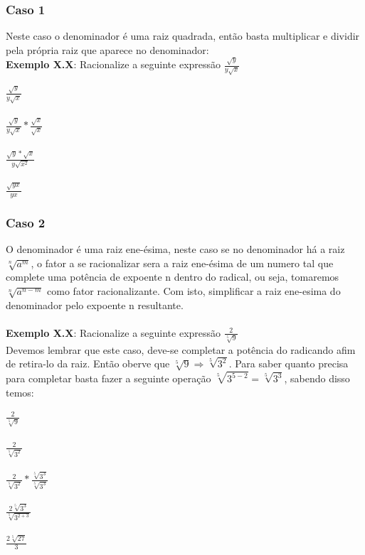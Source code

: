 \documentclass[a4paper,12pt,twoside,BCOR=10mm]{scrbook}
\begin{document}
\begin{titlepage}
\subsubsection{Caso 1}
Neste caso o denominador é uma raiz quadrada, então basta multiplicar e dividir pela própria raiz que aparece no denominador:
\\
\textbf{Exemplo X.X}: Racionalize a seguinte expressão $\frac{\sqrt{y}}{y\sqrt{x}}$
\\
\begin{center}
$\frac{\sqrt{y}}{y\sqrt{x}}$\\ \\
$\frac{\sqrt{y}}{y\sqrt{x}}*\frac{\sqrt{x}}{\sqrt{x}}$\\ \\
$\frac{\sqrt{y}*\sqrt{x}}{y\sqrt{x^{2}}}$\\ \\
$\frac{\sqrt{yx}}{yx}$
\end{center}

\subsubsection{Caso 2}
O denominador é uma raiz ene-ésima, neste caso se no denominador há a raiz $\sqrt[n]{a^{m}}$, o fator a se racionalizar sera a raiz ene-ésima de um numero tal que complete uma potência de expoente n dentro do radical, ou seja, tomaremos $\sqrt[n]{a^{n-m}}$ como fator racionalizante. Com isto, simplificar a raiz ene-esima do denominador pelo expoente n resultante.
\\
\\
\textbf{Exemplo X.X}: Racionalize a seguinte expressão $\frac{2}{\sqrt[5]{9}}$
\\
Devemos lembrar que este caso, deve-se completar a potência do radicando afim de retira-lo da raiz. Então oberve que $\sqrt[5]{9} \Rightarrow \sqrt[5]{3^{2}}$. Para saber quanto precisa para completar basta fazer a seguinte operação $\sqrt[5]{3^{5 - 2}} = \sqrt[5]{3^{3}}$, sabendo disso temos:
\begin{center}
$\frac{2}{\sqrt[5]{9}}$\\ \\
$\frac{2}{\sqrt[5]{3^{2}}}$ \\ \\
$\frac{2}{\sqrt[5]{3^{2}}}*\frac{\sqrt[5]{3^{3}}}{\sqrt[5]{3^{3}}}$\\ \\
$\frac{2\sqrt[5]{3^{3}}}{\sqrt[5]{3^{2+3}}}$\\ \\
$\frac{2\sqrt[5]{27}}{3}$\\ \\
\end{center}


\end{titlepage}
\end{document}
